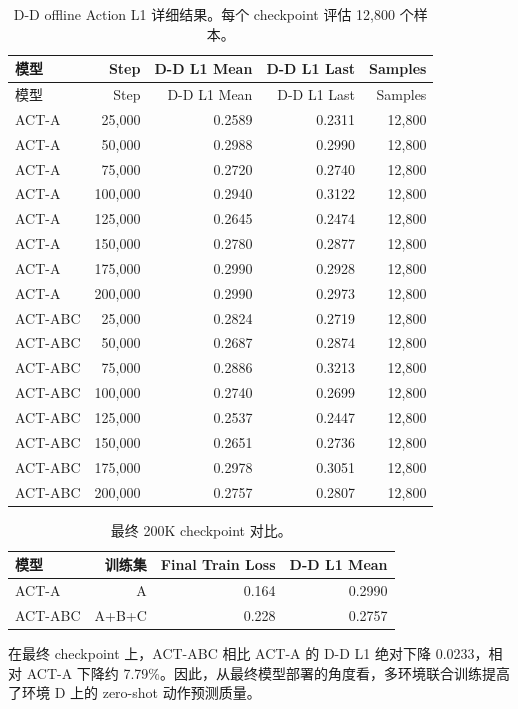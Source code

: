 \documentclass[11pt,a4paper]{ctexart}
\begin{document}
\begin{longtable}{lrrrr}
\caption{D-D offline Action L1 详细结果。每个 checkpoint 评估 12,800 个样本。}
\label{tab:dd_l1}\\
\toprule
模型 & Step & D-D L1 Mean & D-D L1 Last & Samples \\
\midrule
\endfirsthead
\toprule
模型 & Step & D-D L1 Mean & D-D L1 Last & Samples \\
\midrule
\endhead
ACT-A & 25,000 & 0.2589 & 0.2311 & 12,800 \\
ACT-A & 50,000 & 0.2988 & 0.2990 & 12,800 \\
ACT-A & 75,000 & 0.2720 & 0.2740 & 12,800 \\
ACT-A & 100,000 & 0.2940 & 0.3122 & 12,800 \\
ACT-A & 125,000 & 0.2645 & 0.2474 & 12,800 \\
ACT-A & 150,000 & 0.2780 & 0.2877 & 12,800 \\
ACT-A & 175,000 & 0.2990 & 0.2928 & 12,800 \\
ACT-A & 200,000 & 0.2990 & 0.2973 & 12,800 \\
ACT-ABC & 25,000 & 0.2824 & 0.2719 & 12,800 \\
ACT-ABC & 50,000 & 0.2687 & 0.2874 & 12,800 \\
ACT-ABC & 75,000 & 0.2886 & 0.3213 & 12,800 \\
ACT-ABC & 100,000 & 0.2740 & 0.2699 & 12,800 \\
ACT-ABC & 125,000 & 0.2537 & 0.2447 & 12,800 \\
ACT-ABC & 150,000 & 0.2651 & 0.2736 & 12,800 \\
ACT-ABC & 175,000 & 0.2978 & 0.3051 & 12,800 \\
ACT-ABC & 200,000 & 0.2757 & 0.2807 & 12,800 \\
\bottomrule
\end{longtable}

\begin{table}[H]
\centering
\caption{最终 200K checkpoint 对比。}
\begin{tabular}{lrrr}
\toprule
模型 & 训练集 & Final Train Loss & D-D L1 Mean \\
\midrule
ACT-A & A & 0.164 & 0.2990 \\
ACT-ABC & A+B+C & 0.228 & 0.2757 \\
\bottomrule
\end{tabular}
\end{table}

在最终 checkpoint 上，ACT-ABC 相比 ACT-A 的 D-D L1 绝对下降 0.0233，相对 ACT-A 下降约 7.79\%。因此，从最终模型部署的角度看，多环境联合训练提高了环境 D 上的 zero-shot 动作预测质量。
\end{document}
